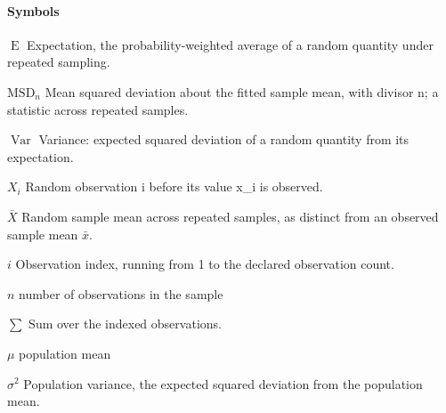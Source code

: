 \documentclass[11pt,a4paper]{article}
\begin{document}
\paragraph{Symbols}
\par\noindent\textbf{\(\operatorname{E}\)} Expectation, the probability-weighted average of a random quantity under repeated sampling.
\par\noindent\textbf{\(\mathrm{MSD}_n\)} Mean squared deviation about the fitted sample mean, with divisor n; a statistic across repeated samples.
\par\noindent\textbf{\(\operatorname{Var}\)} Variance: expected squared deviation of a random quantity from its expectation.
\par\noindent\textbf{\(X_i\)} Random observation i before its value x\_i is observed.
\par\noindent\textbf{\(\bar X\)} Random sample mean across repeated samples, as distinct from an observed sample mean \ensuremath{\bar{x}}.
\par\noindent\textbf{\(i\)} Observation index, running from 1 to the declared observation count.
\par\noindent\textbf{\(n\)} number of observations in the sample
\par\noindent\textbf{\(\sum\)} Sum over the indexed observations.
\par\noindent\textbf{\(\mu\)} population mean
\par\noindent\textbf{\(\sigma^2\)} Population variance, the expected squared deviation from the population mean.
\medskip
\end{document}
